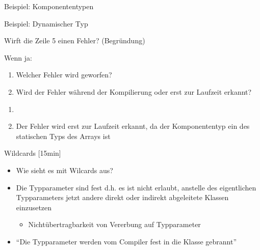 \documentclass{../tuda-beamer}
\begin{document}
    \begin{frame}[c]{Beispiel: Komponententypen}
        
    \end{frame}

    \begin{frame}[c]{Beispiel: Dynamischer Typ}
        
    \end{frame}

    \begin{frame}
        Wirft die Zeile 5 einen Fehler? (Begründung)

        Wenn ja:

        \begin{enumerate}
            \item Welcher Fehler wird geworfen?
            \item Wird der Fehler während der Kompilierung oder erst zur Laufzeit erkannt?
        \end{enumerate}

        

        \pause

        \begin{enumerate}
            \item {}
            \item Der Fehler wird erst zur Laufzeit erkannt, da der Komponententyp ein des
            statischen Typs des Arrays ist
        \end{enumerate}
    \end{frame}

    \begin{frame}[c]{Wildcards [15min]}
        \begin{itemize}
            \item Wie sieht es mit Wilcards aus?
            \item Die Typparameter sind fest d.h. es ist nicht erlaubt, anstelle des eigentlichen
            Typparameters jetzt andere direkt oder indirekt abgeleitete Klassen einzusetzen
            \begin{itemize}
                \item Nichtübertragbarkeit von Vererbung auf Typparameter
            \end{itemize}
            \item \enquote{Die Typparameter werden vom Compiler fest in die Klasse gebrannt}
        \end{itemize}
    \end{frame}
\end{document}
